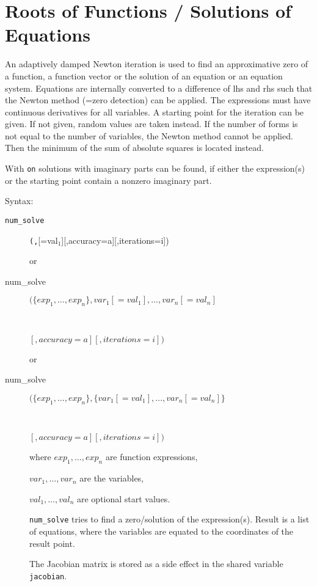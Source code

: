 \section{Roots of Functions / Solutions of Equations}
\hypertarget{operator:NUM_SOLVE}{}

An adaptively damped Newton iteration is used to find
an approximative zero of a function, a function vector or the solution
of an equation or an equation system. Equations are
internally converted to a difference of lhs and rhs such
that the Newton method (=zero detection) can be applied. The expressions
must have continuous derivatives for all variables.
A starting point for the iteration can be given. If not given,
random values are taken instead. If the number of
forms is not equal to the number of variables, the
Newton method cannot be applied. Then the minimum
of the sum of absolute squares is located instead.

With \texttt{on}  solutions with imaginary parts can be
found, if either the expression(s) or the starting point
contain a nonzero imaginary part.

Syntax:

\begin{description}
\item[\texttt{num\_solve}] \texttt{(}\texttt{,}[=val$_1$][,accuracy=a][,iterations=i])

or

\item[num\_solve]  $(\{exp_1,\ldots,exp_n\},
   var_1[=val_1],\ldots,var_n[=val_n]$
\item[\ \ \ \ \ \ \ \ ]$[,accuracy=a][,iterations=i])$

or

\item[num\_solve]  $(\{exp_1,\ldots,exp_n\},
   \{var_1[=val_1],\ldots,var_n[=val_n]\}$
\item[\ \ \ \ \ \ \ \ ]$[,accuracy=a][,iterations=i])$

where $exp_1, \ldots,exp_n$ are function expressions,

      $var_1, \ldots, var_n$ are the variables,

      $val_1, \ldots, val_n$ are optional start values.

\texttt{num\_solve} tries to find a zero/solution of the expression(s).
Result is a list of equations, where the variables are
equated to the coordinates of the result point.

\hypertarget{reserved:JACOBIAN}{}
The Jacobian matrix is stored as a side effect in the shared
variable \texttt{jacobian}.

\end{description}

